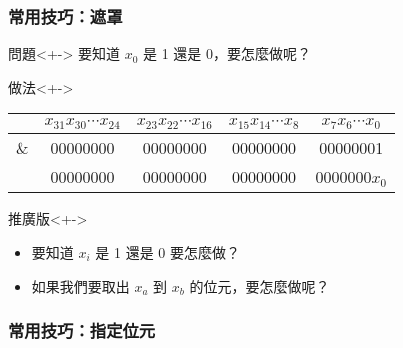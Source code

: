 \documentclass[utf8]{beamer}
\begin{document}
\begin{CJK}{UTF8}{bkai}
\begin{frame}[fragile]
  \frametitle{常用技巧：遮罩}
  \begin{block}{問題}<+->
  要知道 $x_0$ 是 1 還是 0，要怎麼做呢？
  \end{block}
  \begin{exampleblock}{做法}<+->
    \begin{table}[h]
      \begin{tabular}{|c|c|c|c|c|}
      \hline
          & $x_{31}x_{30}\cdots{x_{24}}$ & $x_{23}x_{22}\cdots{x_{16}}$ & $x_{15}x_{14}\cdots{x_{8}}$ & $x_{7}x_{6}\cdots{x_{0}}$\\
      \hline
      $\&$ & 00000000 & 00000000 & 00000000 & 0000000\alert{1}\\
      \hline
      \hline
          & 00000000 & 00000000 & 00000000 & 0000000\alert{$x_0$}\\
      \hline
      \end{tabular}
    \end{table}
  \end{exampleblock}
  \begin{alertblock}{推廣版}<+->
    \begin{itemize}
    \item 要知道 $x_i$ 是 1 還是 0 要怎麼做？
    \item<+-> 如果我們要取出 $x_a$ 到 $x_b$ 的位元，要怎麼做呢？
    \end{itemize}
  \end{alertblock}
\end{frame}

\begin{frame}[fragile]
  \frametitle{常用技巧：指定位元}
\end{frame}


\end{CJK}
\end{document}
